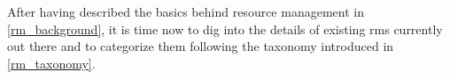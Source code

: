 After having described the basics behind resource management in \autoref{rm_background}, it is time now to dig into the details of existing \glspl{rm} currently out there and to categorize them following the taxonomy introduced in \autoref{rm_taxonomy}.
